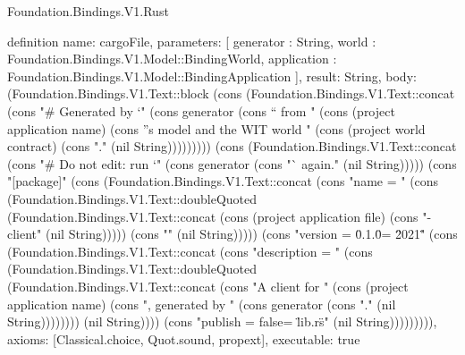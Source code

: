 \begin{lexlean}{Foundation.Bindings.V1.Rust}
\begin{semanticmodule}
definition{
  name: cargoFile,
  parameters: [
    generator : String,
    world : Foundation.Bindings.V1.Model::BindingWorld,
    application : Foundation.Bindings.V1.Model::BindingApplication
  ],
  result: String,
  body: (Foundation.Bindings.V1.Text::block (cons (Foundation.Bindings.V1.Text::concat (cons "# Generated by `" (cons generator (cons "` from " (cons (project application name) (cons "'s model and the WIT world " (cons (project world contract) (cons "." (nil String))))))))) (cons (Foundation.Bindings.V1.Text::concat (cons "# Do not edit: run `" (cons generator (cons "` again." (nil String))))) (cons "[package]" (cons (Foundation.Bindings.V1.Text::concat (cons "name = " (cons (Foundation.Bindings.V1.Text::doubleQuoted (Foundation.Bindings.V1.Text::concat (cons (project application file) (cons "-client" (nil String))))) (cons "" (nil String))))) (cons "version = \"0.1.0\"\nedition = \"2021\"" (cons (Foundation.Bindings.V1.Text::concat (cons "description = " (cons (Foundation.Bindings.V1.Text::doubleQuoted (Foundation.Bindings.V1.Text::concat (cons "A client for " (cons (project application name) (cons ", generated by " (cons generator (cons "." (nil String)))))))) (nil String)))) (cons "publish = false\n\n[lib]\npath = \"lib.rs\"\n\n[dependencies]" (nil String))))))))),
  axioms: [Classical.choice, Quot.sound, propext],
  executable: true
}


\end{semanticmodule}
\end{lexlean}

